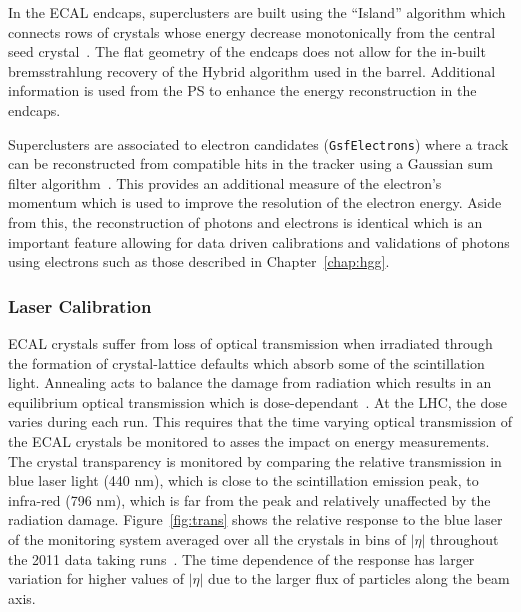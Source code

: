 In the ECAL endcaps, superclusters are built using the ``Island'' algorithm which connects
rows of crystals whose energy decrease monotonically from the central seed crystal~\cite{cseez}.
The flat geometry of the endcaps does not allow for the in-built bremsstrahlung recovery
of the Hybrid algorithm used in the barrel. Additional information is used from the PS to enhance the 
energy reconstruction in the endcaps. 

Superclusters are associated to electron candidates (\texttt{GsfElectrons}) 
where a track can be reconstructed from
compatible hits in the tracker using a Gaussian sum filter algorithm~\cite{GSF_Electron_Reconstruction_CMS}.  
This provides an additional measure of the electron's momentum which is used 
to improve the resolution of the electron energy.
Aside from this, the reconstruction of photons and electrons is identical which is an 
important feature allowing for data driven calibrations and validations of photons using 
electrons such as those described in Chapter~\ref{chap:hgg}.


\subsubsection{Laser Calibration}

ECAL crystals suffer from loss of optical transmission when irradiated through 
the formation of crystal-lattice defaults which absorb some of the scintillation light. Annealing
acts to balance the damage from radiation which results in an equilibrium optical 
transmission which is dose-dependant~\cite{TDR1}. 
At the LHC, the dose varies during each run. This requires that the time varying optical transmission of the ECAL 
crystals be monitored to asses the impact on energy measurements.
The crystal transparency is monitored by comparing the relative transmission in blue laser light (440 nm), 
which is close to the scintillation emission peak, to infra-red (796 nm), which is far from the 
peak and relatively unaffected by the radiation damage.
Figure~\ref{fig:trans} shows the relative response to the blue laser of the monitoring system
averaged over all the crystals in bins of $|\eta|$ throughout the 2011 data taking 
runs~\cite{CMS-DP-2012-007}. 
The time dependence of the response has larger variation for higher values of $|\eta|$ due to the larger flux
of particles along the beam axis.


